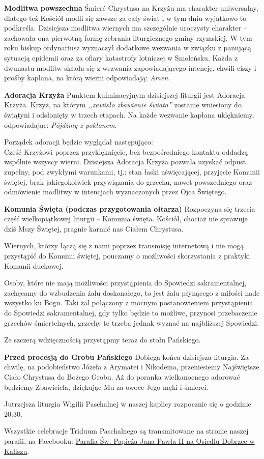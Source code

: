 \documentclass[10pt,oneside,final,notitlepage,a4paper,wide]{mwart}
\begin{document}
	\textbf{Modlitwa powszechna} Śmierć Chrystusa na Krzyżu ma charakter uniwersalny, dlatego też Kościół modli się zawsze za cały świat i w tym dniu wyjątkowo to podkreśla. Dzisiejsza modlitwa wiernych ma szczególnie uroczysty charakter -- zachowała ona pierwotną formę zebrania liturgicznego gminy rzymskiej. W tym roku biskup ordynariusz wyznaczył dodatkowe wezwania w związku z panującą sytuacją epidemii oraz za ofiary katastrofy lotniczej w Smoleńsku. Każda z dwunastu modlitw składa się z wezwania zapowiadającego intencję, chwili ciszy i prośby kapłana, na którą wierni odpowiadają: \emph{Amen}.\bigskip
	
	\textbf{Adoracja Krzyża} Punktem kulminacyjnym dzisiejszej liturgii jest Adoracja Krzyża. Krzyż, na którym \emph{,,zawisło zbawienie świata''} zostanie wniesiony do świątyni i odsłonięty w trzech etapach. Na każde wezwanie kapłana uklękniemy, odpowiadając: \emph{Pójdźmy z pokłonem}.
\par Porządek adoracji będzie wyglądał następująco:\\
Cześć Krzyżowi poprzez przyklęknięcie, bez bezpośredniego kontaktu oddadzą wspólnie wszyscy wierni. Dzisiejsza Adoracja Krzyża pozwala uzyskać odpust zupełny, pod zwykłymi warunkami, tj.: stan łaski uświęcającej, przyjęcie Komunii świętej, brak jakiegokolwiek przywiązania do grzechu, nawet powszedniego oraz odmówienie modlitwy w intencjach wyznaczonych przez Ojca Świętego. \newpage %
	
	\textbf{Komunia Święta (podczas przygotowania ołtarza)} Rozpoczyna się trzecia część wielkopiątkowej liturgii -- Komunia święta. Kościół, chociaż nie sprawuje dziś Mszy Świętej, pragnie karmić nas Ciałem Chrystusa.
	\par Wiernych, którzy łączą się z nami poprzez transmisję internetową i nie mogą przystąpić do Komunii świętej, pouczamy o możliwości skorzystania z praktyki Komunii duchowej.
	\par Osoby, które nie mają możliwości przystąpienia do Spowiedzi sakramentalnej, zachęcamy do wzbudzenia żalu doskonałego, to jest żalu płynącego z miłości nade wszystko ku Bogu. Taki żal połączony z mocnym postanowieniem przystąpienia do Spowiedzi sakramentalnej, gdy tylko będzie to możliwe, przynosi przebaczenie grzechów śmiertelnych, grzechy te trzeba jednak wyznać na najbliższej Spowiedzi.
\par Ze szczerą wdzięcznością przystąpmy teraz do stołu Pańskiego. \bigskip

	\textbf{Przed procesją do Grobu Pańskiego} Dobiega końca dzisiejsza liturgia. Za chwilę, na podobieństwo Józefa z Arymatei i Nikodema, przeniesiemy Najświętsze Ciało Chrystusa do Bożego Grobu. Aż do poranka wielkanocnego adorować będziemy Zbawiciela, dziękując Mu za owoce Jego męki i śmierci. \bigskip
	
	Jutrzejsza liturgia Wigilii Paschalnej w naszej kaplicy rozpocznie się o godzinie 20:30.
	
	Wszystkie celebracje Triduum Paschalnego są transmitowane na stronie naszej parafii, na Facebooku: \href{https://www.facebook.com/Parafia-\%C5\%9Aw-Papie\%C5\%BCa-Jana-Paw\%C5\%82a-II-na-Osiedlu-Dobrzec-w-Kaliszu-104456801212546/}{Parafia Św. Papieża Jana Pawła II na Osiedlu Dobrzec w Kaliszu}.
\end{document}
